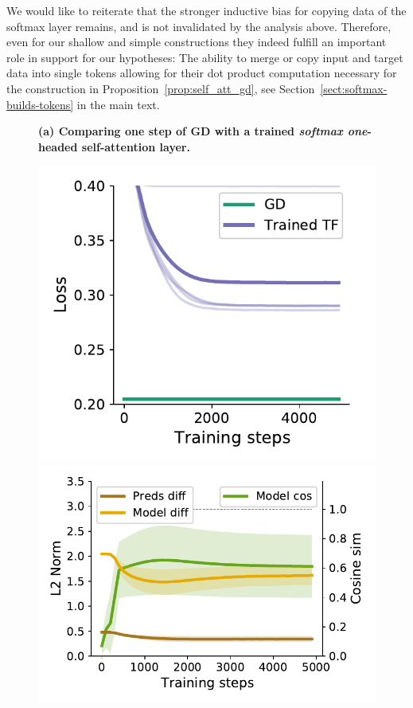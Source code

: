 \documentclass{article}
\theoremstyle{plain}
\theoremstyle{definition}
\theoremstyle{remark}
\begin{document}
We would like to reiterate that the stronger inductive bias for copying data of the softmax layer remains, and is not invalidated by the analysis above. Therefore, even for our shallow and simple constructions they indeed fulfill an important role in support for our hypotheses: The ability to merge or copy input and target data into single tokens allowing for their dot product computation necessary for the construction in Proposition~\ref{prop:self_att_gd}, see Section~\ref{sect:softmax-builds-tokens} in the main text.

\begin{figure}
\textbf{(a) Comparing one step of GD with a trained \textit{softmax one}-headed self-attention layer.}
\begin{center}
\begin{minipage}{.22\textwidth}
  \centering
  \begin{center}
    \includegraphics[width=1.\textwidth]{Final_figures/softmax/train_21.pdf}
  \end{center}
  \vspace{-10pt}
\end{minipage}
\begin{minipage}{.28\textwidth}
  \centering
  \begin{center}
    \includegraphics[width=1.\textwidth]{Final_figures/softmax/sim_5.pdf}

\end{center}
\end{minipage}
\end{center}
\end{figure}
\end{document}

